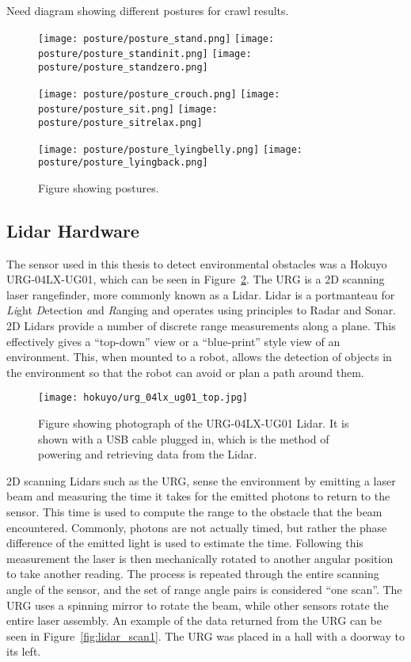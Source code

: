 Need diagram showing different postures for crawl results. 
\begin{figure}
\centerline{\texttt{[image: posture/posture\_stand.png]}
            \texttt{[image: posture/posture\_standinit.png]}
            \texttt{[image: posture/posture\_standzero.png]}
}
\vspace*{0.05in}
\centerline{\texttt{[image: posture/posture\_crouch.png]}
            \texttt{[image: posture/posture\_sit.png]}
            \texttt{[image: posture/posture\_sitrelax.png]}
}
\vspace*{0.05in}
\centerline{\texttt{[image: posture/posture\_lyingbelly.png]}
            \texttt{[image: posture/posture\_lyingback.png]}
}
\caption{Figure showing postures.}
\label{fig:nao_postures1}
\end{figure}


\clearpage

\subsection{Lidar Hardware}
The sensor used in this thesis to detect environmental obstacles was a Hokuyo
URG-04LX-UG01, which can be seen in Figure~\ref{fig:lidar_top1}. 
The URG is a 2D scanning laser rangefinder, more commonly known as
a Lidar. Lidar is a portmanteau for \textit{Li}ght \textit{D}etection 
\textit{a}nd \textit{R}anging and operates using principles to Radar and Sonar. 
2D Lidars provide a number of discrete range measurements along a plane. 
This effectively gives a ``top-down'' view or a ``blue-print'' style view of
an environment.
This, when mounted to a robot, allows the detection of objects in
the environment so that the robot can avoid or plan a path around them.

\begin{figure}
\centering
\texttt{[image: hokuyo/urg\_04lx\_ug01\_top.jpg]}
\caption{Figure showing photograph of the URG-04LX-UG01 Lidar. It is shown
         with a USB cable plugged in, which is the method of powering
         and retrieving data from the Lidar.}
\label{fig:lidar_top1}
\end{figure}

2D scanning Lidars such as the URG, sense the environment by emitting a laser
beam and measuring the time it takes for the emitted photons to return to the sensor.
This time is used to compute the range to the obstacle that the beam encountered.
Commonly, photons are not actually timed, but rather the phase difference of the
emitted light is used to estimate the time.
Following this measurement the laser is then mechanically rotated to another 
angular position to take another reading. The process is repeated through the 
entire scanning angle of the sensor, and the set of range angle pairs is 
considered ``one scan''. The URG uses a spinning mirror to rotate the beam, while
other sensors rotate the entire laser assembly.
An example of the data returned from the URG can be seen in Figure~\ref{fig:lidar_scan1}.
The URG was placed in a hall with a doorway to its left.


